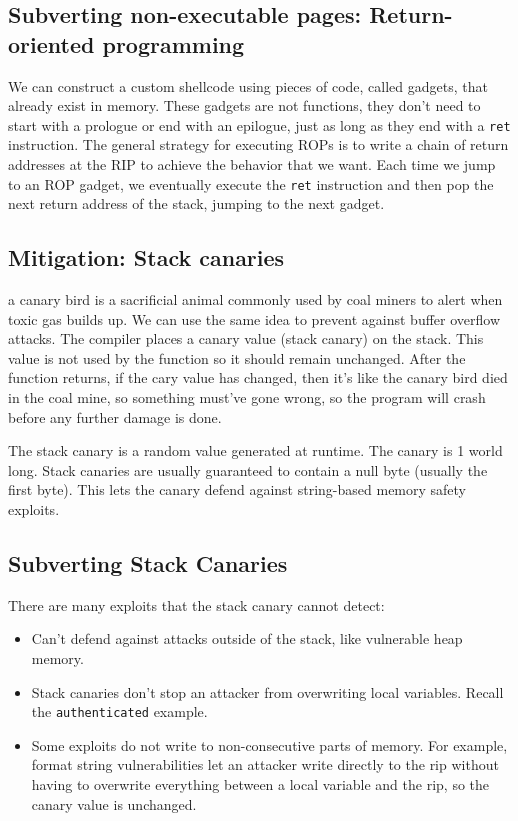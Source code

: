 \documentclass{article}
\begin{document}
\subsection{Subverting non-executable pages: Return-oriented programming}
We can construct a custom shellcode using pieces of code, called gadgets, that already exist in memory. These gadgets are not functions, they don't need to start with a prologue or end with an epilogue, just as long as they end with a \lstinline{ret} instruction. The general strategy for executing ROPs is to write a chain of return addresses at the RIP to achieve the behavior that we want. Each time we jump to an ROP gadget, we eventually execute the \lstinline{ret} instruction and then pop the next return address of the stack, jumping to the next gadget.

\subsection{Mitigation: Stack canaries}
a canary bird is a sacrificial animal commonly used by coal miners to alert when toxic gas builds up. We can use the same idea to prevent against buffer overflow attacks. The compiler places a canary value (stack canary) on the stack. This value is not used by the function so it should remain unchanged. After the function returns, if the cary value has changed, then it's like the canary bird died in the coal mine, so something must've gone wrong, so the program will crash before any further damage is done.

The stack canary is a random value generated at runtime. The canary is 1 world long. Stack canaries are usually guaranteed to contain a null byte (usually the first byte). This lets the canary defend against string-based memory safety exploits.

\subsection{Subverting Stack Canaries}
There are many exploits that the stack canary cannot detect:

\begin{itemize}
    \item Can't defend against attacks outside of the stack, like vulnerable heap memory.
    \item Stack canaries don't stop an attacker from overwriting local variables. Recall the \lstinline{authenticated} example.
    \item Some exploits do not write to non-consecutive parts of memory. For example, format string vulnerabilities let an attacker write directly to the rip without having to overwrite everything between a local variable and the rip, so the canary value is unchanged.
\end{itemize}
\end{document}
